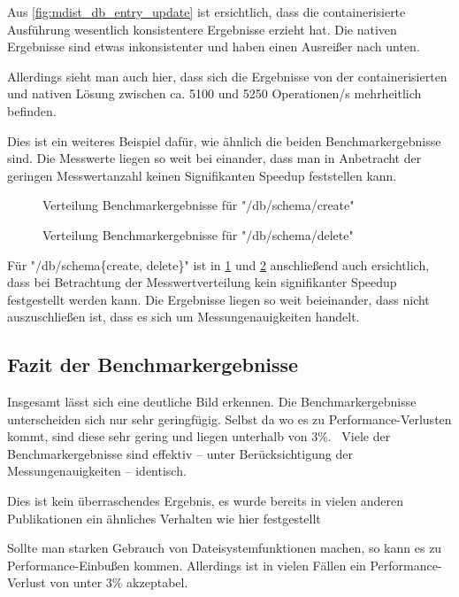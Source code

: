 \FloatBarrier

Aus \cref{fig:mdist_db_entry_update} ist ersichtlich, dass die containerisierte Ausführung wesentlich konsistentere Ergebnisse erzieht hat. 
Die nativen Ergebnisse sind etwas inkonsistenter und haben einen Ausreißer nach unten. 

Allerdings sieht man auch hier, dass sich die Ergebnisse von der containerisierten und nativen Lösung zwischen ca. 5100 und 5250 Operationen/s mehrheitlich befinden. 

Dies ist ein weiteres Beispiel dafür, wie ähnlich die beiden Benchmarkergebnisse sind. Die Messwerte liegen so weit bei einander, dass man in Anbetracht der geringen Messwertanzahl keinen Signifikanten Speedup feststellen kann.

\begin{figure}[H]
    \centering
    
    \caption{Verteilung Benchmarkergebnisse für "/db/schema/create"}
    \label{fig:mdist_db_schema_create}
\end{figure}

\begin{figure}[H]
    \centering
    
    \caption{Verteilung Benchmarkergebnisse für "/db/schema/delete"}
    \label{fig:mdist_db_schema_delete}
\end{figure}

Für "/db/schema\{create, delete\}" ist in \cref{fig:mdist_db_schema_create} und \cref{fig:mdist_db_schema_delete} anschließend auch ersichtlich, dass bei Betrachtung der Messwertverteilung kein signifikanter Speedup festgestellt werden kann. Die Ergebnisse liegen so weit beieinander, dass nicht auszuschließen ist, dass es sich um Messungenauigkeiten handelt.

\FloatBarrier

\subsection{Fazit der Benchmarkergebnisse}

Insgesamt lässt sich eine deutliche Bild erkennen. Die Benchmarkergebnisse unterscheiden sich nur sehr geringfügig. Selbst da wo es zu Performance-Verlusten kommt, sind diese sehr gering und liegen unterhalb von $3\%$. \
Viele der Benchmarkergebnisse sind effektiv – unter Berücksichtigung der Messungenauigkeiten – identisch.

Dies ist kein überraschendes Ergebnis, es wurde bereits in vielen anderen Publikationen ein ähnliches Verhalten wie hier festgestellt \cite[Vgl. S. 2589ff]{huExploringPerformanceSingularity2019}

Sollte man starken Gebrauch von Dateisystemfunktionen machen, so kann es zu Performance-Einbußen kommen. Allerdings ist in vielen Fällen ein Performance-Verlust von unter $3\%$ akzeptabel.